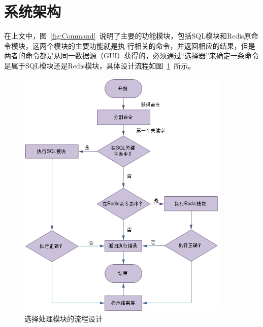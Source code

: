 \documentclass{zjutthesis}
\begin{document}
\section{系统架构}
在上文中，图~\ref{fig:Command}~说明了主要的功能模块，包括SQL模块和Redis原命令模块，这两个模块的主要功能就是执
行相关的命令，并返回相应的结果，但是两者的命令都是从同一数据源（GUI）获得的，必须通过“选择器”来确定一条命令是属于SQL模块还是Redis模块，具体设计流程如图~\ref{fig:Selector}~所示。
\begin{figure}[H]
\centering
\includegraphics[width=0.9\textwidth]{Selector}
\caption{选择处理模块的流程设计}\label{fig:Selector}
\vspace{\baselineskip} %
\end{figure}


\end{document}
